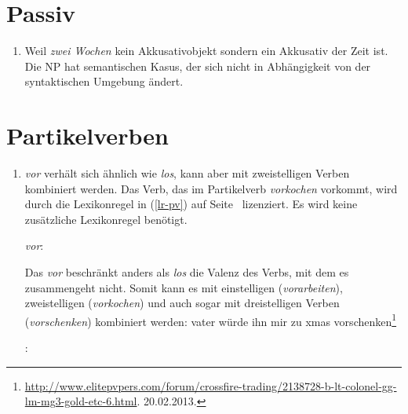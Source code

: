 \section{Passiv}

\begin{enumerate}
\item Weil \emph{zwei Wochen} kein Akkusativobjekt sondern ein Akkusativ der Zeit ist. Die NP hat
  semantischen Kasus, der sich nicht in Abhängigkeit von der syntaktischen Umgebung ändert.

\end{enumerate}


\section{Partikelverben}

\begin{enumerate}
\item \emph{vor} verhält sich ähnlich wie \emph{los}, kann aber mit zweistelligen Verben kombiniert
  werden. Das Verb, das im Partikelverb \emph{vorkochen} vorkommt, wird durch die Lexikonregel in
  (\ref{lr-pv}) auf Seite~\pageref{lr-pv} lizenziert. Es wird keine zusätzliche Lexikonregel benötigt.

\eas
\label{le-vor}
\mbox{\emph{vor}:}\\
\zs{}

Das \emph{vor} beschränkt anders als \emph{los} die Valenz des Verbs, mit dem es zusammengeht
nicht. Somit kann es mit einstelligen (\emph{vorarbeiten}), zweistelligen (\emph{vorkochen}) und
auch sogar mit dreistelligen Verben (\emph{vorschenken}) kombiniert werden:
\ea
vater würde ihn mir zu xmas vorschenken\footnote{
  \url{http://www.elitepvpers.com/forum/crossfire-trading/2138728-b-lt-colonel-gg-lm-mg3-gold-etc-6.html}. 20.02.2013.
}
\z

\eas
\label{le-kochen}
\mbox{:}\\
\zs

\end{enumerate}


